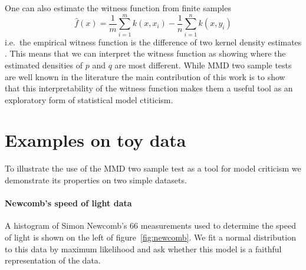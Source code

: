 \documentclass{article} %
\def\ie{i.e.\ }
\begin{document}
One can also estimate the witness function from finite samples
\vspace{-0.3\baselineskip}
\begin{equation}
\hat{f}(x) = \frac{1}{m}\sum_{i=1}^{m}k(x,x_i) - \frac{1}{n}\sum_{i=1}^{n}k(x,y_i)
\label{eq:witness-estimate}
\end{equation}
\ie the empirical witness function is the difference of two kernel density estimates \citep[e.g.][]{Rosenblatt1956-hx, Parzen1962-hk}.
This means that we can interpret the witness function as showing where the estimated densities of $p$ and $q$ are most different.
While MMD two sample tests are well known in the literature the main contribution of this work is to show that this interpretability of the witness function makes them a useful tool as an exploratory form of statistical model ctiticism.

\section{Examples on toy data}

To illustrate the use of the MMD two sample test as a tool for model criticism we demonstrate its properties on two simple datasets.

\paragraph{Newcomb's speed of light data}

A histogram of Simon Newcomb's 66 measurements used to determine the speed of light \citep{Stigler1977-dd} is shown on the left of figure~\ref{fig:newcomb}.
We fit a normal distribution to this data by maximum likelihood and ask whether this model is a faithful representation of the data.
\end{document}
